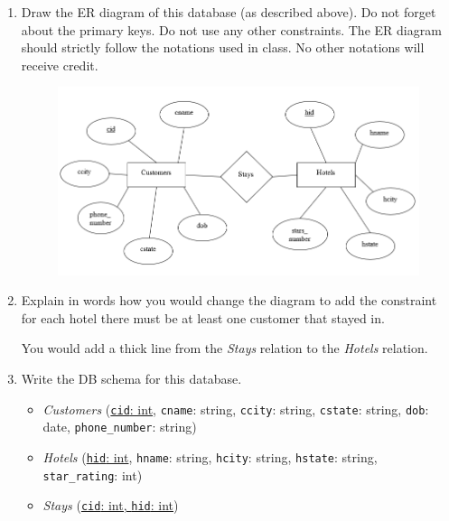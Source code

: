 \documentclass[letterpaper, 11pt]{article}
\begin{document}
\begin{enumerate}[label={\alph*}.,leftmargin=*]
    \item Draw the ER diagram of this database (as described above). Do not forget about the primary keys. Do not use any other constraints. The ER diagram should strictly follow the notations used in class. No other notations will receive credit.
    \begin{tcolorbox}
    \begin{figure}[H]
        \centering
        \includegraphics[scale=0.8]{midterm-1a.png}
    \end{figure}
    \end{tcolorbox}
    \item Explain in words how you would change the diagram to add the constraint for each hotel there must be at least one customer that stayed in.
    \begin{tcolorbox}
        You would add a thick line from the \textit{Stays} relation to the \textit{Hotels} relation.
    \end{tcolorbox}
    \item Write the DB schema for this database.
    \begin{tcolorbox}
    \begin{itemize}[leftmargin=*]
        \item \textit{Customers} (\ul{\texttt{cid}: int}, \texttt{cname}: string, \texttt{ccity}: string, \texttt{cstate}: string, \texttt{dob}: date, \texttt{phone\_number}: string)
        \item \textit{Hotels} (\ul{\texttt{hid}: int}, \texttt{hname}: string, \texttt{hcity}: string, \texttt{hstate}: string, \texttt{star\_rating}: int)
        \item \textit{Stays} (\ul{\texttt{cid}: int, \texttt{hid}: int})
    \end{itemize}
    \end{tcolorbox}
\end{enumerate}
\end{document}
